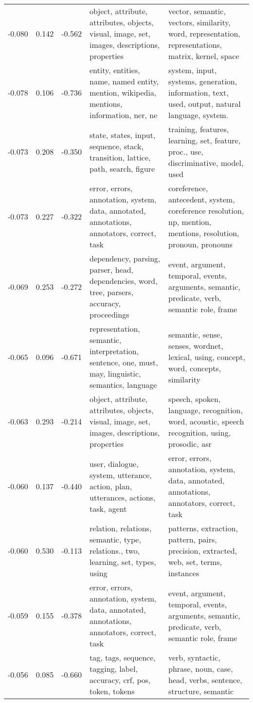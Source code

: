 \begin{tabular}{cccp{5cm}p{5cm}}
-0.080 & 0.142 & -0.562 & object, attribute, attributes, objects, visual, image, set, images, descriptions, properties & vector, semantic, vectors, similarity, word, representation, representations, matrix, kernel, space \\
-0.078 & 0.106 & -0.736 & entity, entities, name, named entity, mention, wikipedia, mentions, information, ner, ne & system, input, systems, generation, information, text, used, output, natural language, system. \\
-0.073 & 0.208 & -0.350 & state, states, input, sequence, stack, transition, lattice, path, search, figure & training, features, learning, set, feature, proc., use, discriminative, model, used \\
-0.073 & 0.227 & -0.322 & error, errors, annotation, system, data, annotated, annotations, annotators, correct, task & coreference, antecedent, system, coreference resolution, np, mention, mentions, resolution, pronoun, pronouns \\
-0.069 & 0.253 & -0.272 & dependency, parsing, parser, head, dependencies, word, tree, parsers, accuracy, proceedings & event, argument, temporal, events, arguments, semantic, predicate, verb, semantic role, frame \\
-0.065 & 0.096 & -0.671 & representation, semantic, interpretation, sentence, one, must, may, linguistic, semantics, language & semantic, sense, senses, wordnet, lexical, using, concept, word, concepts, similarity \\
-0.063 & 0.293 & -0.214 & object, attribute, attributes, objects, visual, image, set, images, descriptions, properties & speech, spoken, language, recognition, word, acoustic, speech recognition, using, prosodic, asr \\
-0.060 & 0.137 & -0.440 & user, dialogue, system, utterance, action, plan, utterances, actions, task, agent & error, errors, annotation, system, data, annotated, annotations, annotators, correct, task \\
-0.060 & 0.530 & -0.113 & relation, relations, semantic, type, relations., two, learning, set, types, using & patterns, extraction, pattern, pairs, precision, extracted, web, set, terms, instances \\
-0.059 & 0.155 & -0.378 & error, errors, annotation, system, data, annotated, annotations, annotators, correct, task & event, argument, temporal, events, arguments, semantic, predicate, verb, semantic role, frame \\
-0.056 & 0.085 & -0.660 & tag, tags, sequence, tagging, label, accuracy, crf, pos, token, tokens & verb, syntactic, phrase, noun, case, head, verbs, sentence, structure, semantic \\

\end{tabular}

